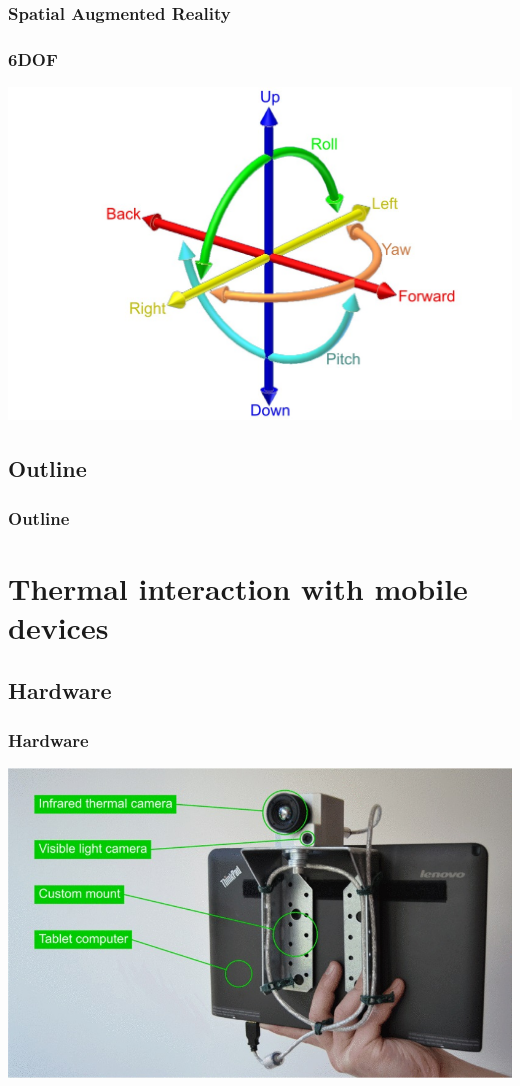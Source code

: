 \documentclass{beamer}
\begin{document}
\begin{frame}
	\frametitle{Spatial Augmented Reality}
\end{frame}

\begin{frame}
	\frametitle{6DOF}
	\includegraphics[width=\textwidth]{../Sample_paper/images/6DOF_en}
\end{frame}

\subsection*{Outline}
\begin{frame}
  \frametitle{Outline}
  \tableofcontents[hideallsubsections]
\end{frame}

\section[Mobile Thermal Interaction]{Thermal interaction with mobile devices}

\subsection{Hardware}
\begin{frame}
\frametitle{Hardware}	

	\includegraphics[width=\textwidth]{../Sample_paper/images/Hardware2}
	
\end{frame}
\end{document}
